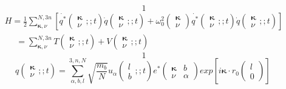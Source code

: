 \[1\] 
\[ \begin{array}{l}
H=\frac{1}{2}\sum\limits^{N,3n}_{{\mathbf \kappa },\nu }{\left[\dot{q^*}\left( \begin{array}{c}
{\mathbf \kappa } \\ 
\nu  \end{array}
;;t\right)\dot{q}\left( \begin{array}{c}
{\mathbf \kappa } \\ 
\nu  \end{array}
;;t\right)+{\omega }^2_0\left( \begin{array}{c}
{\mathbf \kappa } \\ 
\nu  \end{array}
\right)\dot{q^*}\left( \begin{array}{c}
{\mathbf \kappa } \\ 
\nu  \end{array}
;;t\right)\dot{q}\left( \begin{array}{c}
{\mathbf \kappa } \\ 
\nu  \end{array}
;;t\right)\right]} \\ 
\ \ \ \ \ \ =\sum\limits^{N,3n}_{{\mathbf \kappa },\nu }{T\left( \begin{array}{c}
{\mathbf \kappa } \\ 
\nu  \end{array}
;;t\right)+V\left( \begin{array}{c}
{\mathbf \kappa } \\ 
\nu  \end{array}
;;t\right)} \end{array}
\] 
\[1\] 
\[q\left( \begin{array}{c}
{\mathbf \kappa } \\ 
\nu  \end{array}
;;t\right)=\sum\limits^{3,n,N}_{\alpha ,b,l}{\sqrt{\frac{m_b}{N}}}u_{\alpha }\left( \begin{array}{c}
l \\ 
b \end{array}
;;t\right)e^*\left( \begin{array}{cc}
{\mathbf \kappa } & b \\ 
\nu  & \alpha  \end{array}
\right){exp \left[i{\mathbf \kappa }\cdot r_0\left( \begin{array}{c}
l \\ 
0 \end{array}
\right)\right]\ }\] 
